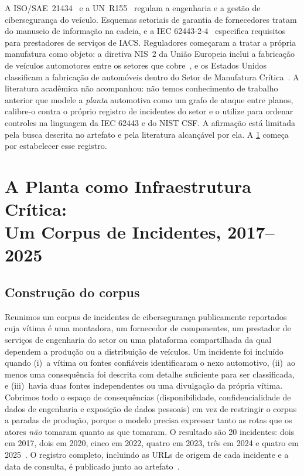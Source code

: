 A ISO/SAE~21434~\cite{isosae21434} e a UN~R155~\cite{unr155} regulam a
engenharia e a gestão de cibersegurança do veículo. Esquemas setoriais de
garantia de fornecedores tratam do manuseio de informação na cadeia, e a IEC
62443-2-4~\cite{iec6244324} especifica requisitos para prestadores de serviços
de IACS. Reguladores começaram a tratar a própria manufatura como objeto: a
diretiva NIS~2 da União Europeia inclui a fabricação de veículos automotores
entre os setores que cobre~\cite{nis2directive}, e os Estados Unidos
classificam a fabricação de automóveis dentro do Setor de Manufatura
Crítica~\cite{cisacriticalmanufacturing}. A literatura acadêmica não acompanhou:
não temos conhecimento de trabalho anterior que modele a \emph{planta}
automotiva como um grafo de ataque entre planos, calibre-o contra o próprio
registro de incidentes do setor e o utilize para ordenar controles na
linguagem da IEC 62443 e do NIST CSF. A afirmação está limitada pela busca
descrita no artefato e pela literatura alcançável por ela. A \cref{sec:corpus} começa por estabelecer esse registro.

\section{A Planta como Infraestrutura Crítica:\\ Um Corpus de Incidentes, 2017--2025}
\label{sec:corpus}

\subsection{Construção do corpus}

Reunimos um corpus de incidentes de cibersegurança publicamente reportados cuja
vítima é uma montadora, um fornecedor de componentes, um prestador de serviços
de engenharia do setor ou uma plataforma compartilhada da qual dependem a
produção ou a distribuição de veículos. Um incidente foi incluído quando (i)~a
vítima ou fontes confiáveis identificaram o nexo automotivo, (ii)~ao menos uma
consequência foi descrita com detalhe suficiente para ser classificada, e
(iii)~havia duas fontes independentes ou uma divulgação da própria vítima.
Cobrimos todo o espaço de consequências (disponibilidade, confidencialidade de
dados de engenharia e exposição de dados pessoais) em vez de restringir o corpus a paradas de produção, porque o modelo precisa
expressar tanto as rotas que os atores \emph{não} tomaram quanto as que
tomaram. O resultado são 20 incidentes: dois em 2017, dois em 2020, cinco em
2022, quatro em 2023, três em 2024 e quatro em
2025~\cite{inc01renault,inc01nbc,inc03honda,inc04toyota,inc04infosec,inc05denso,%
inc06bridgestone,inc07continental,inc08tesla,inc09toyotacloud,inc10vw,inc11cdk,%
inc14yanfeng,inc17stellantis,inc18cmc,inc18cw,inc19toyotagithub,inc20mks}. O
registro completo, incluindo as URLs de origem de cada incidente e a data de
consulta, é publicado junto ao artefato~\cite{capmartifact}.

